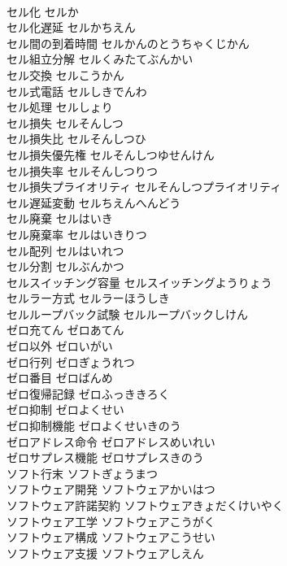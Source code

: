 \documentclass[8pt]{extreport}
\begin{document}
\begin{CJK}{UTF8}{min}
\\	セル化	セルか	
\\	セル化遅延	セルかちえん	
\\	セル間の到着時間	セルかんのとうちゃくじかん	
\\	セル組立分解	セルくみたてぶんかい	
\\	セル交換	セルこうかん	
\\	セル式電話	セルしきでんわ	
\\	セル処理	セルしょり	
\\	セル損失	セルそんしつ	
\\	セル損失比	セルそんしつひ	
\\	セル損失優先権	セルそんしつゆせんけん	
\\	セル損失率	セルそんしつりつ	
\\	セル損失プライオリティ	セルそんしつプライオリティ	
\\	セル遅延変動	セルちえんへんどう	
\\	セル廃棄	セルはいき	
\\	セル廃棄率	セルはいきりつ	
\\	セル配列	セルはいれつ	
\\	セル分割	セルぶんかつ	
\\	セルスイッチング容量	セルスイッチングようりょう	
\\	セルラー方式	セルラーほうしき	
\\	セルループバック試験	セルループバックしけん	
\\	ゼロ充てん	ゼロあてん	
\\	ゼロ以外	ゼロいがい	
\\	ゼロ行列	ゼロぎょうれつ	
\\	ゼロ番目	ゼロばんめ	
\\	ゼロ復帰記録	ゼロふっききろく	
\\	ゼロ抑制	ゼロよくせい	
\\	ゼロ抑制機能	ゼロよくせいきのう	
\\	ゼロアドレス命令	ゼロアドレスめいれい	
\\	ゼロサプレス機能	ゼロサプレスきのう	
\\	ソフト行末	ソフトぎょうまつ	
\\	ソフトウェア開発	ソフトウェアかいはつ	
\\	ソフトウェア許諾契約	ソフトウェアきょだくけいやく	
\\	ソフトウェア工学	ソフトウェアこうがく	
\\	ソフトウェア構成	ソフトウェアこうせい	
\\	ソフトウェア支援	ソフトウェアしえん	

\end{CJK}
\end{document}

